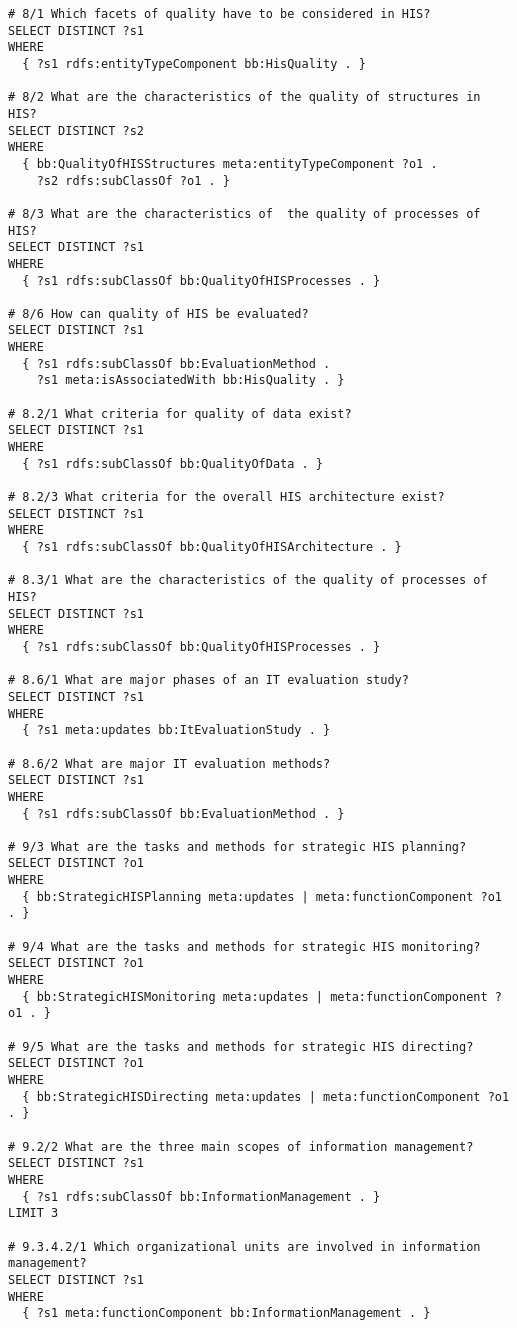 \begin{lstlisting}[language=SPARQL]
# 8/1 Which facets of quality have to be considered in HIS?
SELECT DISTINCT ?s1
WHERE
  { ?s1 rdfs:entityTypeComponent bb:HisQuality . }

# 8/2 What are the characteristics of the quality of structures in HIS?
SELECT DISTINCT ?s2
WHERE
  { bb:QualityOfHISStructures meta:entityTypeComponent ?o1 .
    ?s2 rdfs:subClassOf ?o1 . }

# 8/3 What are the characteristics of  the quality of processes of HIS?
SELECT DISTINCT ?s1
WHERE
  { ?s1 rdfs:subClassOf bb:QualityOfHISProcesses . }

# 8/6 How can quality of HIS be evaluated?
SELECT DISTINCT ?s1
WHERE
  { ?s1 rdfs:subClassOf bb:EvaluationMethod .
    ?s1 meta:isAssociatedWith bb:HisQuality . }

# 8.2/1 What criteria for quality of data exist?
SELECT DISTINCT ?s1
WHERE
  { ?s1 rdfs:subClassOf bb:QualityOfData . }

# 8.2/3 What criteria for the overall HIS architecture exist?
SELECT DISTINCT ?s1
WHERE
  { ?s1 rdfs:subClassOf bb:QualityOfHISArchitecture . }

# 8.3/1 What are the characteristics of the quality of processes of HIS?
SELECT DISTINCT ?s1
WHERE
  { ?s1 rdfs:subClassOf bb:QualityOfHISProcesses . }

# 8.6/1 What are major phases of an IT evaluation study?
SELECT DISTINCT ?s1
WHERE
  { ?s1 meta:updates bb:ItEvaluationStudy . }

# 8.6/2 What are major IT evaluation methods?
SELECT DISTINCT ?s1
WHERE
  { ?s1 rdfs:subClassOf bb:EvaluationMethod . }

# 9/3 What are the tasks and methods for strategic HIS planning?
SELECT DISTINCT ?o1
WHERE
  { bb:StrategicHISPlanning meta:updates | meta:functionComponent ?o1 . }

# 9/4 What are the tasks and methods for strategic HIS monitoring?
SELECT DISTINCT ?o1
WHERE
  { bb:StrategicHISMonitoring meta:updates | meta:functionComponent ?o1 . }

# 9/5 What are the tasks and methods for strategic HIS directing?
SELECT DISTINCT ?o1
WHERE
  { bb:StrategicHISDirecting meta:updates | meta:functionComponent ?o1 . }

# 9.2/2 What are the three main scopes of information management?
SELECT DISTINCT ?s1
WHERE
  { ?s1 rdfs:subClassOf bb:InformationManagement . }
LIMIT 3

# 9.3.4.2/1 Which organizational units are involved in information management?
SELECT DISTINCT ?s1
WHERE
  { ?s1 meta:functionComponent bb:InformationManagement . }


\end{lstlisting}
